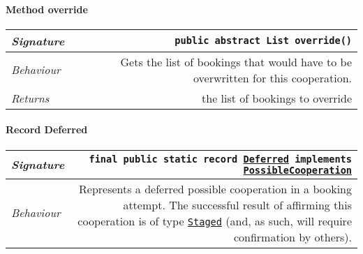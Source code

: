 \begin{adjustwidth}{1.5em}{0pt}
\begin{adjustwidth}{1.5em}{0pt}
\begin{adjustwidth}{1.5em}{0pt}
\begin{adjustwidth}{1.5em}{0pt}
{\begin{tabularx}{1.0\linewidth}{@{}l R@{}}
        \end{tabularx}}
      \end{adjustwidth}\paragraph{Method override\label{edu.kit.hci.soli.dto.BookingAttemptResult.PossibleCooperation@override()}}
      \begin{adjustwidth}{1.5em}{0pt}
        {\begin{tabularx}{1.0\linewidth}{@{}l R@{}}
          \emph{Signature} & \texttt{public abstract \texttt{List} override()} \\
          \hline
          \emph{Behaviour} & Gets the list of bookings that would have to be overwritten for this cooperation.    \\
          \hline
          \emph{Returns} & the list of bookings to override  \\
          \hline
  
        \end{tabularx}}
      \end{adjustwidth}\paragraph{Record Deferred\label{edu.kit.hci.soli.dto.BookingAttemptResult.PossibleCooperation.Deferred} }
      \begin{adjustwidth}{1.5em}{0pt}
        {\begin{tabularx}{1.0\linewidth}{@{}l R@{}}
          \emph{Signature} & \texttt{final public static  record \texttt{\hyperref[edu.kit.hci.soli.dto.BookingAttemptResult.PossibleCooperation.Deferred]{\texttt{Deferred}} implements \texttt{\hyperref[edu.kit.hci.soli.dto.BookingAttemptResult.PossibleCooperation]{\texttt{PossibleCooperation}}}}} \\
          \hline
          \emph{Behaviour} & Represents a deferred possible cooperation in a booking attempt. The successful result of affirming this cooperation is of type  \texttt{\hyperref[edu.kit.hci.soli.dto.BookingAttemptResult.Staged]{\texttt{Staged}}} (and, as such, will require confirmation by others).  \\
          \hline
  

\end{tabularx}}
\end{adjustwidth}
\end{adjustwidth}
\end{adjustwidth}
\end{adjustwidth}

